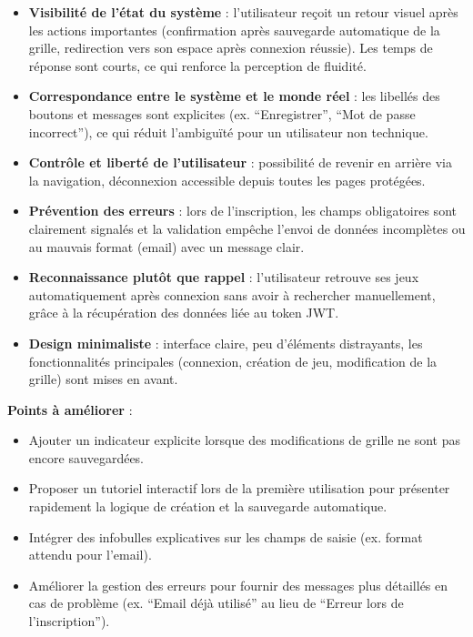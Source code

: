 \documentclass[12pt]{article}        %
\begin{document}
\begin{itemize}
  \item \textbf{Visibilité de l’état du système} : l’utilisateur reçoit un retour visuel après les actions importantes (confirmation après sauvegarde automatique de la grille, redirection vers son espace après connexion réussie). Les temps de réponse sont courts, ce qui renforce la perception de fluidité.
  
  \item \textbf{Correspondance entre le système et le monde réel} : les libellés des boutons et messages sont explicites (ex. “Enregistrer”, “Mot de passe incorrect”), ce qui réduit l’ambiguïté pour un utilisateur non technique.
  
  \item \textbf{Contrôle et liberté de l’utilisateur} : possibilité de revenir en arrière via la navigation, déconnexion accessible depuis toutes les pages protégées.
  
  \item \textbf{Prévention des erreurs} : lors de l’inscription, les champs obligatoires sont clairement signalés et la validation empêche l’envoi de données incomplètes ou au mauvais format (email) avec un message clair.
  
  \item \textbf{Reconnaissance plutôt que rappel} : l’utilisateur retrouve ses jeux automatiquement après connexion sans avoir à rechercher manuellement, grâce à la récupération des données liée au token JWT.
  
  \item \textbf{Design minimaliste} : interface claire, peu d’éléments distrayants, les fonctionnalités principales (connexion, création de jeu, modification de la grille) sont mises en avant.
\end{itemize}


\noindent\textbf{Points à améliorer} :
\begin{itemize}
  \item Ajouter un indicateur explicite lorsque des modifications de grille ne sont pas encore sauvegardées.
  \item Proposer un tutoriel interactif lors de la première utilisation pour présenter rapidement la logique de création et la sauvegarde automatique.
  \item Intégrer des infobulles explicatives sur les champs de saisie (ex. format attendu pour l’email).
    \item Améliorer la gestion des erreurs pour fournir des messages plus détaillés en cas de problème (ex. “Email déjà utilisé” au lieu de “Erreur lors de l’inscription”).
\end{itemize}
\end{document}
